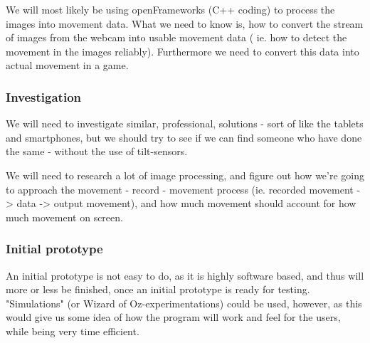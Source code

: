 We will most likely be using openFrameworks (C++ coding) to process the images into movement data. What we need to know is, how to convert the stream of images from the webcam into usable movement data ( ie. how to detect the movement in the images reliably). Furthermore we need to convert this data into actual movement in a game.

\subsubsection*{Investigation}
We will need to investigate similar, professional, solutions - sort of like the tablets and smartphones, but we should try to see if we can find someone who have done the same - without the use of tilt-sensors.
\bigskip

We will need to research a lot of image processing, and figure out how we're going to approach the movement - record - movement process (ie. recorded movement -> data -> output movement), and how much movement should account for how much movement on screen. 

\subsubsection*{Initial prototype}
An initial prototype is not easy to do, as it is highly software based, and thus will more or less be finished, once an initial prototype is ready for testing. "Simulations" (or Wizard of Oz-experimentations) could be used, however, as this would give us some idea of how the program will work and feel for the users, while being very time efficient.
